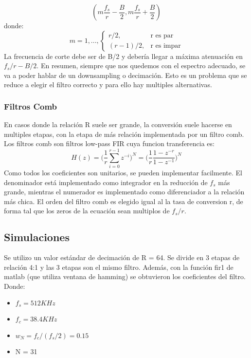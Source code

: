 \documentclass[assd_tp3_main.tex]{subfiles}
\begin{document}
\[ (m\frac{f_s}{r}-\frac{B}{2},m\frac{f_s}{r}+\frac{B}{2}) \]
donde:\\

\begin{equation}
    m = 1,...,
    \begin{cases}
      r/2, & \text{r es par} \\
      (r-1)/2, & \text{r es impar}
    \end{cases}
  \end{equation}
La frecuencia de corte debe ser de B/2 y debería llegar a máxima atenuación en $f_s/r-B/2$.
En resumen, siempre que nos quedemos con el espectro adecuado, se va a poder hablar de un downsampling o decimación. Esto es un problema que se reduce a elegir el filtro correcto y para ello hay multiples alternativas.
\subsubsection{Filtros Comb}
En casos donde la relación R suele ser grande, la conversión suele hacerse en multiples etapas, con la etapa de más relación implementada por un filtro comb.
Los filtros comb son filtros low-pass FIR cuya funcion transferencia es:
$$H(z)=\Bigg(\frac{1}{r}\sum_{i=0}^{r-1} z^{-i}\Bigg)^N = \Bigg(\frac{1}{r}\frac{1-z^{-r}}{1-z^{-1}}\Bigg)^N$$
Como todos los coeficientes son unitarios, se pueden implementar facilmente.
El denominador está implementado como integrador en la reducción de $f_s$ más grande, mientras el numerador es implementado como diferenciador a la relación más chica. El orden del filtro comb es elegido igual al la tasa de conversion r, de forma tal que los zeros de la ecuación sean multiplos de $f_s/r$.

\subsection{Simulaciones}
Se utilizo un valor estándar de decimación de R = 64. Se divide en 3 etapas de relación 4:1 y las 3 etapas son el mismo filtro.
Además, con la función fir1 de matlab (que utiliza ventana de hamming) se obtuvieron los coeficientes del filtro.
Donde:
\begin{itemize}
\item $f_s = 512KHz$
\item $f_c = 38.4KHz$
\item $w_N = f_c/(f_s/2) = 0.15$
\item N = 31
\end{itemize}
\end{document}
